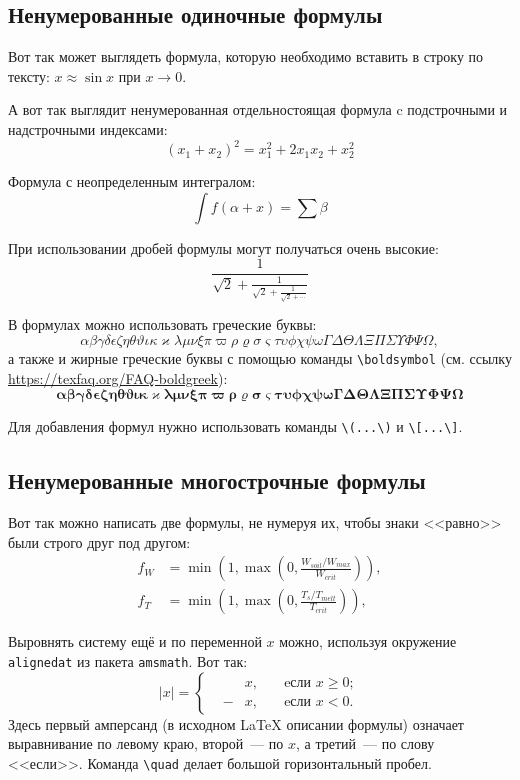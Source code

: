 \documentclass[12pt]{extarticle}
\begin{document}
\subsection{Ненумерованные одиночные формулы}
\label{subsec:ch1/sec3/sub1}
Вот так может выглядеть формула, которую необходимо вставить в строку по тексту: \(x \approx \sin x\) при \(x \to 0\).

А вот так выглядит ненумерованная отдельностоящая формула c подстрочными и надстрочными индексами:
\[(x_1+x_2)^2 = x_1^2 + 2 x_1 x_2 + x_2^2\]

Формула с неопределенным интегралом:
\[\int f(\alpha+x)=\sum\beta\]

При использовании дробей формулы могут получаться очень высокие:
\[\frac{1}{\sqrt{2}+
        \displaystyle\frac{1}{\sqrt{2}+
            \displaystyle\frac{1}{\sqrt{2}+\cdots}}}\]

В формулах можно использовать греческие буквы:
\[\alpha\beta\gamma\delta\epsilon\zeta\eta\theta\vartheta\iota\kappa\varkappa\lambda\mu\nu\xi\pi\varpi\rho\varrho\sigma\varsigma\tau\upsilon\phi\chi\psi\omega\Gamma\Delta\Theta\Lambda\Xi\Pi\Sigma\Upsilon\Phi\Psi\Omega,\]
а также и жирные греческие буквы с помощью команды \texttt{\textbackslash{}boldsymbol} (см. ссылку \url{https://texfaq.org/FAQ-boldgreek}):
\[
\boldsymbol{\alpha\beta\gamma\delta\epsilon\zeta\eta\theta\vartheta\iota\kappa\varkappa\lambda\mu\nu\xi\pi\varpi\rho\varrho\sigma\varsigma\tau\upsilon\phi\chi\psi\omega\Gamma\Delta\Theta\Lambda\Xi\Pi\Sigma\Upsilon\Phi\Psi\Omega}\]

Для добавления формул нужно использовать команды \texttt{\textbackslash{}(...\textbackslash{})} и \texttt{\textbackslash{}[...\textbackslash{}]}.
\subsection{Ненумерованные многострочные формулы}
\label{sec:org2877965}

Вот так можно написать две формулы, не нумеруя их, чтобы знаки {}<<равно>>{} были строго друг под другом:
\[\begin{aligned}
    f_W & =  \min \left( 1, \max \left( 0, \frac{W_{soil} / W_{max}}{W_{crit}} \right)  \right), \nonumber \\
    f_T & =  \min \left( 1, \max \left( 0, \frac{T_s / T_{melt}}{T_{crit}} \right)  \right), \nonumber
\end{aligned}\]

Выровнять систему ещё и по переменной \(x\) можно, используя окружение \texttt{alignedat} из пакета \texttt{amsmath}.
Вот так:
\[|x| = \left\{\begin{alignedat}{2}
     &   & x, \quad & \text{eсли } x\geqslant 0; \\
     & - & x, \quad & \text{eсли } x<0.
\end{alignedat}\right.\]
Здесь первый амперсанд (в исходном \LaTeX{} описании формулы) означает выравнивание по левому краю, второй~--- по \(x\), а третий~--- по слову {}<<если>>{}.
Команда \texttt{\textbackslash{}quad} делает большой горизонтальный пробел.
\end{document}

